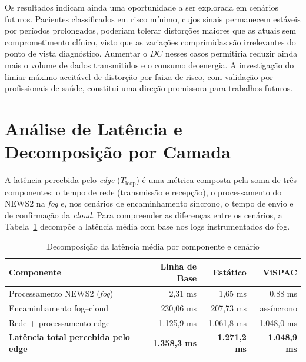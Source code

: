 \documentclass[twoside,english,brazilian]{UNISINOSmonografia}
\begin{document}
Os resultados indicam ainda uma oportunidade a ser explorada em cenários futuros. Pacientes classificados em risco mínimo, cujos sinais permanecem estáveis por períodos prolongados, poderiam tolerar distorções maiores que as atuais sem comprometimento clínico, visto que as variações comprimidas são irrelevantes do ponto de vista diagnóstico. Aumentar o $DC$ nesses casos permitiria reduzir ainda mais o volume de dados transmitidos e o consumo de energia. A investigação do limiar máximo aceitável de distorção por faixa de risco, com validação por profissionais de saúde, constitui uma direção promissora para trabalhos futuros.

\section{Análise de Latência e Decomposição por Camada}
A latência percebida pelo \textit{edge} ($T_{\text{loop}}$) é uma métrica composta pela soma de três componentes: o tempo de rede (transmissão e recepção), o processamento do NEWS2 na \textit{fog} e, nos cenários de encaminhamento síncrono, o tempo de envio e de confirmação da \textit{cloud}. Para compreender as diferenças entre os cenários, a Tabela~\ref{tab:latency_decomposition} decompõe a latência média com base nos logs instrumentados do fog.

\begin{table}[!ht]
\centering
\caption{Decomposição da latência média por componente e cenário}
\label{tab:latency_decomposition}
\footnotesize
\begin{tabular}{|l|r|r|r|}
\hline
\textbf{Componente} & \textbf{Linha de Base} & \textbf{Estático} & \textbf{ViSPAC} \\ \hline
Processamento NEWS2 (\textit{fog}) & 2,31 ms & 1,65 ms & 0,88 ms \\ \hline
Encaminhamento fog–cloud & 230,06 ms & 207,73 ms & assíncrono \\ \hline
Rede + processamento edge & 1.125,9 ms & 1.061,8 ms & 1.048,0 ms \\ \hline
\textbf{Latência total percebida pelo edge} & \textbf{1.358,3 ms} & \textbf{1.271,2 ms} & \textbf{1.048,9 ms} \\ \hline
\end{tabular}
\end{table}
\end{document}
